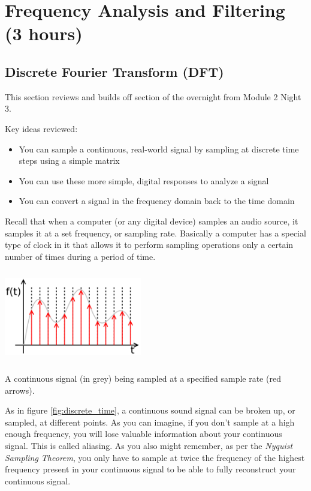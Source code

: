 \documentclass{tufte-handout}
\begin{document}
\section{Frequency Analysis and Filtering (3 hours)}

\subsection{Discrete Fourier Transform (DFT)}
This section reviews and builds off section of the overnight from Module 2 Night 3.

Key ideas reviewed:
\begin{itemize}
	\item You can sample a continuous, real-world signal by sampling at discrete time steps using a simple matrix
	\item You can use these more simple, digital responses to analyze a signal
	\item You can convert a signal in the frequency domain back to the time domain
\end{itemize}

Recall that when a computer (or any digital device) samples an audio source, it samples it at a set frequency, or sampling rate. Basically a computer has a special type of clock in it that allows it to perform sampling operations only a certain number of times during a period of time. 
 
 \begin{marginfigure}
    \centering
    \includegraphics[width = 6cm, height = 4cm]{discrete_time.png}
    \label{fig:discrete_time}
\caption{A continuous signal (in grey) being sampled at a specified sample rate (red arrows).}
	\label{fig:discrete_time}
\end{marginfigure}

As in figure \ref{fig:discrete_time}, a continuous sound signal can be broken up, or sampled, at different points. As you can imagine, if you don't sample at a high enough frequency, you will lose valuable information about your continuous signal. This is called aliasing. As you also might remember, as per the \textit{Nyquist Sampling Theorem}, you only have to sample at twice the frequency of the highest frequency present in your continuous signal to be able to fully reconstruct your continuous signal. 
\end{document}
